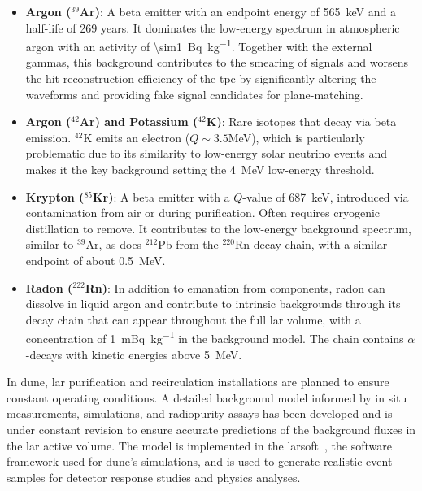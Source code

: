 \begin{itemize}
  \begin{itemize}
    \item \textbf{Argon (\(^{39}\)Ar)}: A beta emitter with an endpoint energy of \SI{565}{\kilo\electronvolt} and a half-life of 269 years. It dominates the low-energy spectrum in atmospheric argon with an activity of \SI{\sim1}{\becquerel\per\kilo\gram}. Together with the external gammas, this background contributes to the smearing of signals and worsens the hit reconstruction efficiency of the \gls{tpc} by significantly altering the waveforms and providing fake signal candidates for plane-matching.
    \item \textbf{Argon (\(^{42}\)Ar) and Potassium (\(^{42}\)K)}: Rare isotopes that decay via beta emission. \(^{42}\)K emits an electron (\(Q \sim 3.5\)\unit{\mega\electronvolt}), which is particularly problematic due to its similarity to low-energy solar neutrino events and makes it the key background setting the \SI{4}{\mega\electronvolt} low-energy threshold.
    \item \textbf{Krypton (\(^{85}\)Kr)}: A beta emitter with a \(Q\)-value of \SI{687}{\kilo\electronvolt}, introduced via contamination from air or during purification. Often requires cryogenic distillation to remove. It contributes to the low-energy background spectrum, similar to \(^{39}\)Ar, as does \(^{212}\)Pb from the \(^{220}\)Rn decay chain, with a similar endpoint of about \SI{0.5}{\mega\electronvolt}.
    \item \textbf{Radon (\(^{222}\)Rn)}: In addition to emanation from components, radon can dissolve in liquid argon and contribute to intrinsic backgrounds through its decay chain that can appear throughout the full \gls{lar} volume, with a concentration of \SI{1}{\milli\becquerel\per\kilo\gram} in the background model. The chain contains $\alpha$-decays with kinetic energies above \SI{5}{\mega\electronvolt}.
  \end{itemize}
\end{itemize}

In \gls{dune}, \gls{lar} purification and recirculation installations are planned to ensure constant operating conditions. A detailed background model informed by in situ measurements, simulations, and radiopurity assays has been developed and is under constant revision to ensure accurate predictions of the background fluxes in the \gls{lar} active volume. The model is implemented in the \gls{larsoft}~\cite{LARSOFT}, the software framework used for \gls{dune}'s simulations, and is used to generate realistic event samples for detector response studies and physics analyses. 


